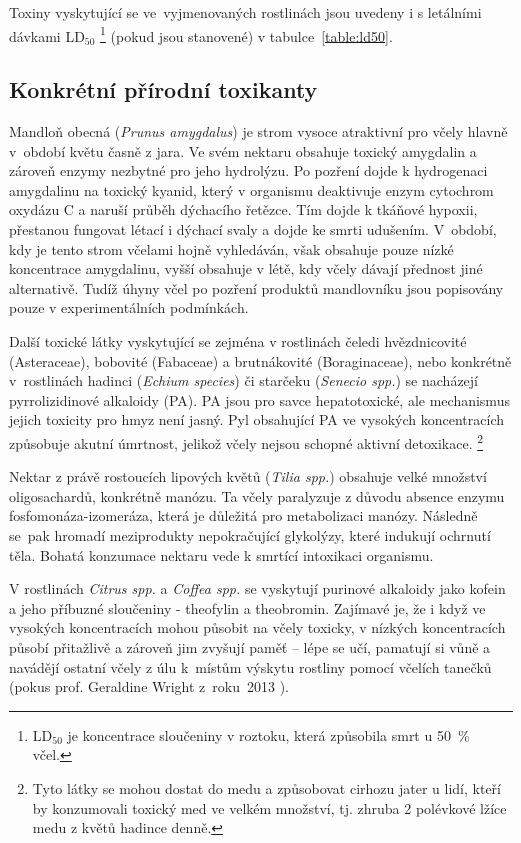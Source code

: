 \documentclass[openany, oneside, a4paper, 12pt, final]{memoir}
\begin{document}
Toxiny vyskytující se ve~vyjmenovaných rostlinách jsou uvedeny i s letálními dávkami LD$_{50}$ \footnote{LD$_{50}$ je koncentrace sloučeniny v roztoku, která způsobila smrt u 50~\% včel.} (pokud jsou stanovené) v tabulce~\ref{table:ld50}. 


\subsection{Konkrétní přírodní toxikanty}
Mandloň obecná (\textit{Prunus amygdalus}) je strom vysoce atraktivní pro včely hlavně v~období květu časně z jara. Ve svém nektaru obsahuje toxický amygdalin a zároveň enzymy nezbytné pro jeho hydrolýzu. Po pozření dojde k hydrogenaci amygdalinu na toxický kyanid, který v organismu deaktivuje enzym cytochrom oxydázu C a naruší průběh dýchacího řetězce. Tím dojde k tkáňové hypoxii, přestanou fungovat létací i dýchací svaly a dojde ke smrti udušením. V~období, kdy je tento strom včelami hojně vyhledáván, však obsahuje pouze nízké koncentrace amygdalinu, vyšší obsahuje v létě, kdy včely dávají přednost jiné alternativě. Tudíž úhyny včel po pozření produktů mandlovníku jsou popisovány pouze v experimentálních podmínkách.
\cite{Almond,London-Shafir2003}


Další toxické látky vyskytující se zejména v rostlinách čeledi hvězdnicovité (Asteraceae), bobovité (Fabaceae) a brutnákovité (Boraginaceae), nebo konkrétně v~rostlinách hadinci (\textit{Echium species}) či starčeku (\textit{Senecio spp.}) se nacházejí pyrrolizidinové alkaloidy (PA). PA jsou pro savce hepatotoxické, ale mechanismus jejich toxicity pro hmyz není jasný. Pyl obsahující PA ve vysokých koncentracích způsobuje akutní úmrtnost, jelikož včely nejsou schopné aktivní detoxikace. \footnote{Tyto látky se mohou dostat do medu a způsobovat cirhozu jater u lidí, kteří by konzumovali toxický med ve velkém množství, tj. zhruba 2 polévkové lžíce medu z květů hadince denně.} \cite{johnson2015honey, PyrolizEagri}


Nektar z právě rostoucích lipových květů (\textit{Tilia spp.}) obsahuje velké množství oligosachardů, konkrétně manózu. Ta včely paralyzuje z důvodu absence enzymu fosfomonáza-izomeráza, která je důležitá pro metabolizaci manózy. Následně se~pak hromadí meziprodukty nepokračující glykolýzy, které indukují ochrnutí těla. Bohatá konzumace nektaru vede k smrtící intoxikaci organismu. \cite{johnson2015honey, Pawlikowski2010}


V rostlinách \textit{Citrus spp.} a \textit{Coffea spp.} se vyskytují purinové alkaloidy jako kofein a jeho příbuzné sloučeniny - theofylin a theobromin. Zajímavé je, že i když ve vysokých koncentracích mohou působit na včely toxicky, v nízkých koncentracích působí přitažlivě a zároveň jim zvyšují paměť -- lépe se učí, pamatují si vůně a navádějí ostatní včely z úlu k~místům výskytu rostliny pomocí včelích tanečků (pokus prof. Geraldine Wright z~roku~2013 \cite{wright2013caffeine}). \cite{johnson2015honey}
 
\end{document}
